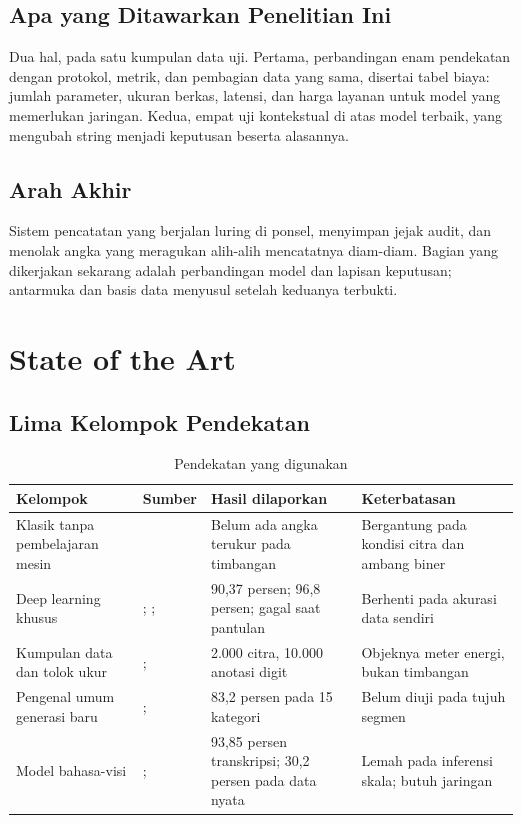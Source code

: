 \documentclass[12pt,a4paper,oneside]{report}
\newcommand{\textcite}[1]{\citet{#1}}
\begin{document}
\section{Apa yang Ditawarkan Penelitian Ini}

Dua hal, pada satu kumpulan data uji. Pertama, perbandingan enam pendekatan dengan
protokol, metrik, dan pembagian data yang sama, disertai tabel biaya: jumlah
parameter, ukuran berkas, latensi, dan harga layanan untuk model yang memerlukan
jaringan. Kedua, empat uji kontekstual di atas model terbaik, yang mengubah string
menjadi keputusan beserta alasannya.

\section{Arah Akhir}

Sistem pencatatan yang berjalan luring di ponsel, menyimpan jejak audit, dan
menolak angka yang meragukan alih-alih mencatatnya diam-diam. Bagian yang
dikerjakan sekarang adalah perbandingan model dan lapisan keputusan; antarmuka dan
basis data menyusul setelah keduanya terbukti.

\chapter{State of the Art}

\section{Lima Kelompok Pendekatan}

\begin{table}[H]
\caption{Pendekatan yang digunakan}
\label{tab:kelompok}
\begin{tabularx}{\textwidth}{@{}L{2.5cm} L{3.7cm} L{3.5cm} X@{}}
\toprule
\textbf{Kelompok} & \textbf{Sumber} & \textbf{Hasil dilaporkan} & \textbf{Keterbatasan} \\
\midrule
Klasik tanpa pembelajaran mesin & \textcite{auerswal_ssocr} & Belum ada angka terukur pada timbangan & Bergantung pada kondisi citra dan ambang biner \\
Deep learning khusus & \textcite{effendi2025unjuk}; \textcite{gushima2023automatic}; \textcite{low2024detecting} & 90,37 persen; 96,8 persen; gagal saat pantulan & Berhenti pada akurasi data sendiri \\
Kumpulan data dan tolok ukur & \textcite{laroca2019convolutional}; \textcite{kanagarathinam2019text} & 2.000 citra, 10.000 anotasi digit & Objeknya meter energi, bukan timbangan \\
Pengenal umum generasi baru & \textcite{zhang2026ppocrv6}; \textcite{zhang2026ppocrv5} & 83,2 persen pada 15 kategori & Belum diuji pada tujuh segmen \\
Model bahasa-visi & \textcite{ega2026leveraging}; \textcite{lin2026measurebench} & 93,85 persen transkripsi; 30,2 persen pada data nyata & Lemah pada inferensi skala; butuh jaringan \\
\bottomrule
\end{tabularx}
\end{table}
\end{document}
